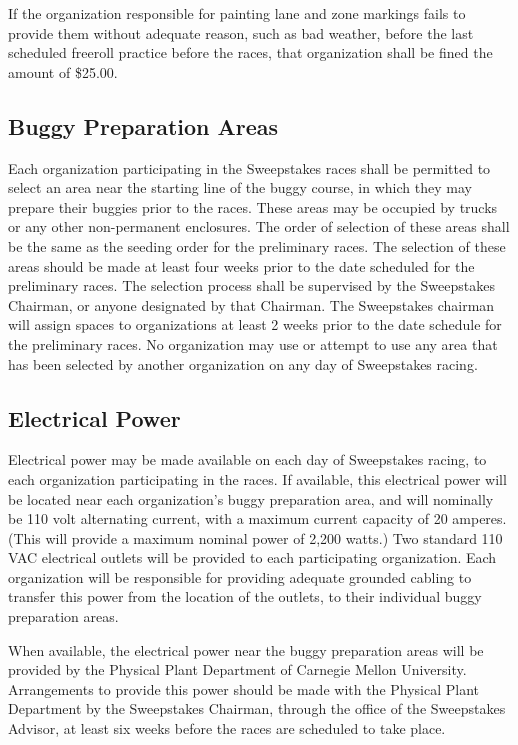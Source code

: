 	If the organization responsible for painting lane and zone markings fails to
	provide them without adequate reason, such as bad weather, before the last
	scheduled freeroll practice before the races, that organization shall be fined
	the amount of \$25.00.

\subsection{Buggy Preparation Areas}

	Each organization participating in the Sweepstakes races shall be permitted to
	select an area near the starting line of the buggy course, in which they may
	prepare their buggies prior to the races. These areas may be occupied by trucks
	or any other non-permanent enclosures. The order of selection of these areas
	shall be the same as the seeding order for the preliminary races. The selection
	of these areas should be made at least four weeks prior to the date scheduled
	for the preliminary races. The selection process shall be supervised by the
	Sweepstakes Chairman, or anyone designated by that Chairman. The Sweepstakes
	chairman will assign spaces to organizations at least 2 weeks prior to the date
	schedule for the preliminary races. No organization may use or attempt to use
	any area that has been selected by another organization on any day of
	Sweepstakes racing.

\subsection{Electrical Power}

	Electrical power may be made available on each day of Sweepstakes racing, to
	each organization participating in the races. If available, this electrical
	power will be located near each organization's buggy preparation area, and will
	nominally be 110 volt alternating current, with a maximum current capacity of
	20 amperes. (This will provide a maximum nominal power of 2,200 watts.) Two
	standard 110 VAC electrical outlets will be provided to each participating
	organization. Each organization will be responsible for providing adequate
	grounded cabling to transfer this power from the location of the outlets, to
	their individual buggy preparation areas.

	When available, the electrical power near the buggy preparation areas will be
	provided by the Physical Plant Department of Carnegie Mellon University.
	Arrangements to provide this power should be made with the Physical Plant
	Department by the Sweepstakes Chairman, through the office of the Sweepstakes
	Advisor, at least six weeks before the races are scheduled to take place.


